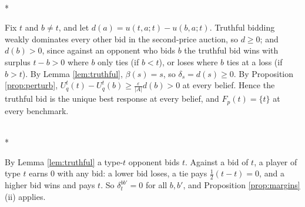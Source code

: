 \documentclass[12pt]{article}
\makeatletter
\theoremstyle{definition}
\renewenvironment{proof}[1][\proofname]{\par
  \pushQED{\qed}%
  \normalfont \topsep6\p@\@plus6\p@\relax
  \trivlist
  \item[\hskip\labelsep\itshape #1\@addpunct{.}]\mbox{}\\*
  \ignorespaces
}{%
  \popQED\endtrivlist\@endpefalse
}
\makeatother
\begin{document}
\begin{proof}[Proof of Corollary \ref{cor:spaperturb}]
Fix $t$ and $b \neq t$, and let $d(a) = u(t, a; t) - u(b, a; t)$. Truthful bidding weakly dominates every other bid in the second-price auction, so $d \ge 0$; and $d(b) > 0$, since against an opponent who bids $b$ the truthful bid wins with surplus $t - b > 0$ where $b$ only ties (if $b < t$), or loses where $b$ ties at a loss (if $b > t$). By Lemma \ref{lem:truthful}, $\beta(s) = s$, so $\delta_s = d(s) \ge 0$. By Proposition \ref{prop:perturb}, $U^t_q(t) - U^t_q(b) \ge \frac{\varepsilon}{|A|} d(b) > 0$ at every belief. Hence the truthful bid is the unique best response at every belief, and $F_p(t) = \{t\}$ at every benchmark.
\end{proof}

\begin{proof}[Proof of Corollary \ref{cor:spamargins}]
By Lemma \ref{lem:truthful} a type-$t$ opponent bids $t$. Against a bid of $t$, a player of type $t$ earns $0$ with any bid: a lower bid loses, a tie pays $\tfrac12(t - t) = 0$, and a higher bid wins and pays $t$. So $\delta^{bb'}_t = 0$ for all $b, b'$, and Proposition \ref{prop:margins}(ii) applies.
\end{proof}
\end{document}
